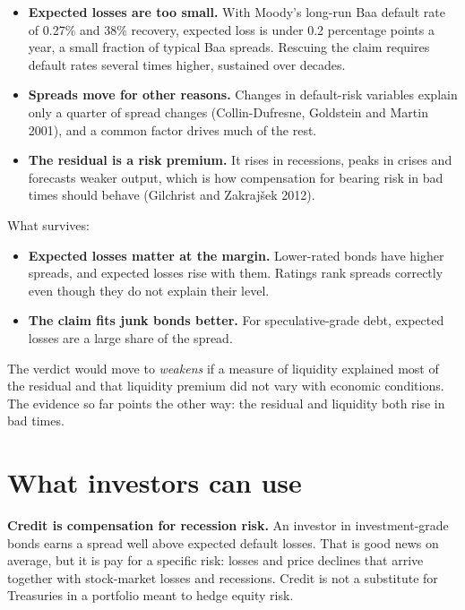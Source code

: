 \begin{itemize}
  \item \textbf{Expected losses are too small.} With Moody's long-run Baa default rate of 0.27\% and 38\% recovery, expected loss is under 0.2 percentage points a year, a small fraction of typical Baa spreads. Rescuing the claim requires default rates several times higher, sustained over decades.
  \item \textbf{Spreads move for other reasons.} Changes in default-risk variables explain only a quarter of spread changes (Collin-Dufresne, Goldstein and Martin 2001), and a common factor drives much of the rest.
  \item \textbf{The residual is a risk premium.} It rises in recessions, peaks in crises and forecasts weaker output, which is how compensation for bearing risk in bad times should behave (Gilchrist and Zakraj\v{s}ek 2012).
\end{itemize}

What survives:

\begin{itemize}
  \item \textbf{Expected losses matter at the margin.} Lower-rated bonds have higher spreads, and expected losses rise with them. Ratings rank spreads correctly even though they do not explain their level.
  \item \textbf{The claim fits junk bonds better.} For speculative-grade debt, expected losses are a large share of the spread.
\end{itemize}

The verdict would move to \emph{weakens} if a measure of liquidity explained most of the residual and that liquidity premium did not vary with economic conditions. The evidence so far points the other way: the residual and liquidity both rise in bad times.

\section{What investors can use}
\label{sec:17-investors}

\textbf{Credit is compensation for recession risk.} An investor in investment-grade bonds earns a spread well above expected default losses. That is good news on average, but it is pay for a specific risk: losses and price declines that arrive together with stock-market losses and recessions. Credit is not a substitute for Treasuries in a portfolio meant to hedge equity risk.

